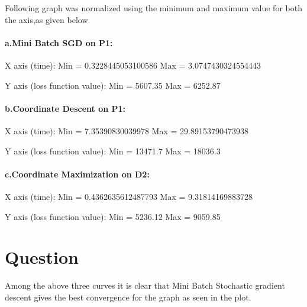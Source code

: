 \documentclass{article}
\begin{document}
Following graph was normalized using the minimum and maximum value for both the axis,as given below
\paragraph{a.Mini Batch SGD on P1:}

X axis (time): Min = 0.3228445053100586 Max = 3.0747430324554443

    Y axis (loss function value): Min = 5607.35 Max = 6252.87



\paragraph{b.Coordinate Descent on P1:}X axis (time): Min = 7.35390830039978 Max = 29.89153790473938

    Y axis (loss function value): Min = 13471.7  Max = 18036.3

    
    \paragraph{c.Coordinate Maximization on D2:}X axis (time): Min = 0.4362635612487793 Max = 9.31814169883728

    Y axis (loss function value): Min = 5236.12 Max = 9059.85



\section{Question}
Among the above three curves it is clear that Mini Batch Stochastic gradient descent gives the best convergence for the graph as seen in the plot.
\end{document}
